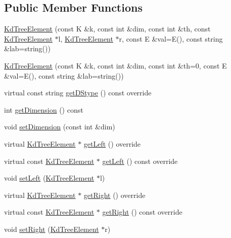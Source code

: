 \subsection*{Public Member Functions}
\begin{DoxyCompactItemize}
\item 
\hyperlink{classbridges_1_1_kd_tree_element_a0a50d048eb39497beed77ed4b0566876}{Kd\+Tree\+Element} (const K \&k, const int \&dim, const int \&th, const \hyperlink{classbridges_1_1_kd_tree_element}{Kd\+Tree\+Element} $\ast$l, \hyperlink{classbridges_1_1_kd_tree_element}{Kd\+Tree\+Element} $\ast$r, const E \&val=E(), const string \&lab=string())
\item 
\hyperlink{classbridges_1_1_kd_tree_element_a50774bfe7e28ddb78bc0da8acec70eb2}{Kd\+Tree\+Element} (const K \&k, const int \&dim, const int \&th=0, const E \&val=E(), const string \&lab=string())
\item 
virtual const string \hyperlink{classbridges_1_1_kd_tree_element_a18326f2def8a9050e382949d70728cf0}{get\+D\+Stype} () const  override
\item 
int \hyperlink{classbridges_1_1_kd_tree_element_a20dec98c3e585170f4832743db99a83c}{get\+Dimension} () const 
\item 
void \hyperlink{classbridges_1_1_kd_tree_element_a8c2c8503d8c8aa0db31fa834dffb60b0}{set\+Dimension} (const int \&dim)
\item 
virtual \hyperlink{classbridges_1_1_kd_tree_element}{Kd\+Tree\+Element} $\ast$ \hyperlink{classbridges_1_1_kd_tree_element_ad7db63a4f82f5252c7e0809ac6486cb4}{get\+Left} () override
\item 
virtual const \hyperlink{classbridges_1_1_kd_tree_element}{Kd\+Tree\+Element} $\ast$ \hyperlink{classbridges_1_1_kd_tree_element_a913d6c95eb6b5074710ebd1528861887}{get\+Left} () const  override
\item 
void \hyperlink{classbridges_1_1_kd_tree_element_a4aabf3ae1f9e77676f5c7b87181ada67}{set\+Left} (\hyperlink{classbridges_1_1_kd_tree_element}{Kd\+Tree\+Element} $\ast$l)
\item 
virtual \hyperlink{classbridges_1_1_kd_tree_element}{Kd\+Tree\+Element} $\ast$ \hyperlink{classbridges_1_1_kd_tree_element_a8e1090891a720231c2009d1d222471e9}{get\+Right} () override
\item 
virtual const \hyperlink{classbridges_1_1_kd_tree_element}{Kd\+Tree\+Element} $\ast$ \hyperlink{classbridges_1_1_kd_tree_element_a0185d1d0ced0616387b7fae8ce81dde2}{get\+Right} () const  override
\item 
void \hyperlink{classbridges_1_1_kd_tree_element_a119124cbfcc0e792ea60cb56c0a63119}{set\+Right} (\hyperlink{classbridges_1_1_kd_tree_element}{Kd\+Tree\+Element} $\ast$r)
\end{DoxyCompactItemize}
